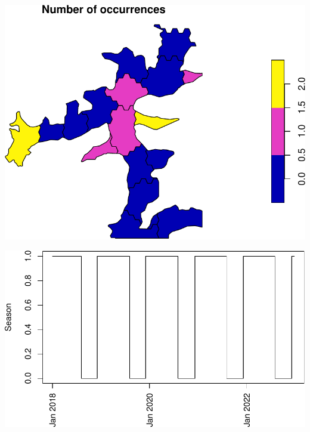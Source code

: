 \documentclass[
]{article}
\begin{document}
\includegraphics{habmodel_files/figure-latex/unnamed-chunk-11-1.pdf}

\includegraphics{habmodel_files/figure-latex/unnamed-chunk-12-1.pdf}
\end{document}
